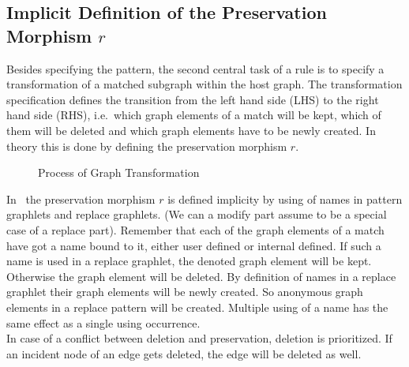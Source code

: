 \subsection{Implicit Definition of the Preservation Morphism $r$}
\label{rule:morphismr}
Besides specifying the pattern, the second central task of a rule is to specify a transformation of a matched subgraph within the host graph. 
The transformation specification defines the transition from the left hand side (LHS) to the right hand side (RHS), i.e.\ which graph elements of a match will be kept, which of them will be deleted and which graph elements have to be newly created.
In theory this is done by defining the preservation morphism $r$.
\begin{figure}[htbp]
	\centering
  \caption{Process of Graph Transformation}
  \label{rule:figrule}
\end{figure}
In \GrG\ the preservation morphism $r$ is defined implicity by using of names in pattern graphlets and replace graphlets. (We can a modify part assume to be a special case of a replace part).
Remember that each of the graph elements of a match have got a name bound to it, either user defined or internal defined. If such a name is used in a replace graphlet, the denoted graph element will be kept. 
Otherwise the graph element will be deleted.
By definition of names in a replace graphlet their graph elements will be newly created.
So anonymous graph elements in a replace pattern will be created.
Multiple using of a name has the same effect as a single using occurrence.\\
In case of a conflict between deletion and preservation, deletion is prioritized. 
If an incident node of an edge gets deleted, the edge will be deleted as well.

